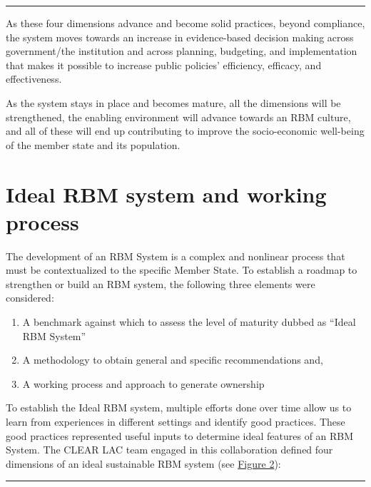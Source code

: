 \documentclass[
  10pt,
]{book}
\providecommand{\tightlist}{%
  \setlength{\itemsep}{0pt}\setlength{\parskip}{0pt}}
\begin{document}
\begin{center}\rule{0.5\linewidth}{0.5pt}\end{center}

As these four dimensions advance and become solid practices, beyond compliance, the system moves towards an increase in evidence-based decision making across government/the institution and across planning, budgeting, and implementation that makes it possible to increase public policies' efficiency, efficacy, and effectiveness.

As the system stays in place and becomes mature, all the dimensions will be strengthened, the enabling environment will advance towards an RBM culture, and all of these will end up contributing to improve the socio-economic well-being of the member state and its population.

\hypertarget{ideal-rbm-system-and-working-process}{%
\section{Ideal RBM system and working process}\label{ideal-rbm-system-and-working-process}}

The development of an RBM System is a complex and nonlinear process that must be contextualized to the specific Member State. To establish a roadmap to strengthen or build an RBM system, the following three elements were considered:

\begin{enumerate}
\def\labelenumi{\arabic{enumi}.}
\tightlist
\item
  A benchmark against which to assess the level of maturity dubbed as ``Ideal RBM System''
\item
  A methodology to obtain general and specific recommendations and,
\item
  A working process and approach to generate ownership
\end{enumerate}

To establish the Ideal RBM system, multiple efforts done over time allow us to learn from experiences in different settings and identify good practices. These good practices represented useful inputs to determine ideal features of an RBM System. The CLEAR LAC team engaged in this collaboration defined four dimensions of an ideal sustainable RBM system (see \protect\hyperlink{fig:figure2}{Figure 2}):

\begin{center}\rule{0.5\linewidth}{0.5pt}\end{center}
\end{document}
